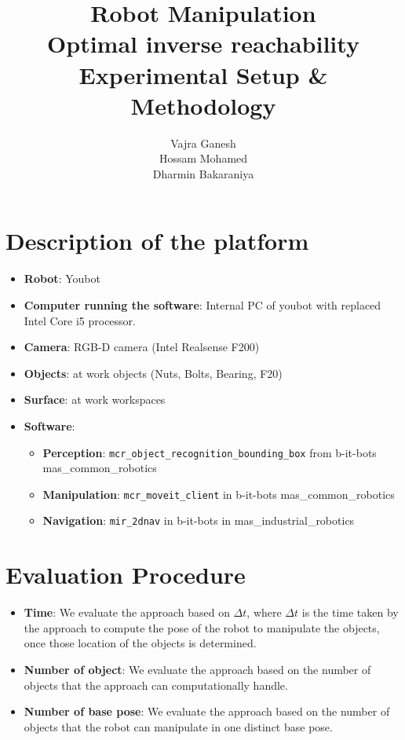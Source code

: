 \documentclass[12pt]{article}
\title{Robot Manipulation\\Optimal inverse reachability\\Experimental Setup \& Methodology}
\author{Vajra Ganesh\\Hossam Mohamed\\Dharmin Bakaraniya}
\begin{document}
\maketitle{}

\section{Description of the platform}%
\label{sec:description_of_the_platform}
\begin{itemize}
    \item \textbf{Robot}: Youbot\cite{youbot}
    \item \textbf{Computer running the software}: Internal PC of youbot with replaced Intel Core i5 processor.
    \item \textbf{Camera}: RGB-D camera (Intel Realsense F200)
    \item \textbf{Objects}: at work objects (Nuts, Bolts, Bearing, F20)
    \item \textbf{Surface}: at work workspaces
    \item \textbf{Software}:
        \begin{itemize}
            \item \textbf{Perception}: \texttt{mcr\_object\_recognition\_bounding\_box} from b-it-bots mas\_common\_robotics\cite{gitRepo}
            \item \textbf{Manipulation}: \texttt{mcr\_moveit\_client} in b-it-bots mas\_common\_robotics\cite{gitRepo}
            \item \textbf{Navigation}: \texttt{mir\_2dnav} in b-it-bots in mas\_industrial\_robotics\cite{gitRepoMir}
        \end{itemize}
\end{itemize}

\section{Evaluation Procedure}
\begin{itemize}
    \item \textbf{Time}: We evaluate the approach based on  $\Delta t$, where $\Delta t$ is the time taken by the approach to compute the pose of the robot to manipulate the objects, once those location of the objects is determined.
    \item \textbf{Number of object}: We evaluate the approach based on the number of objects that the approach can computationally handle.
    \item \textbf{Number of base pose}: We evaluate the approach based on the number of objects that the robot can manipulate in one distinct base pose.
\end{itemize}
\end{document}
